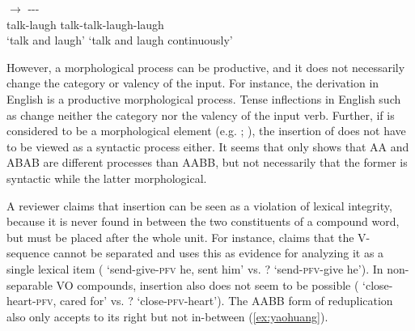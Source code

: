   \ex \gll {} $\rightarrow$ ---\\
  talk-laugh {} talk-talk-laugh-laugh\\ 
  \glt `talk and laugh' `talk and laugh continuously'
  \z
\z

However, a morphological process can be productive, and it does not necessarily change the category or valency of the input.
For instance, the  derivation in English is a productive morphological process.
Tense inflections in English such as  change neither the category nor the valency of the input verb.
Further, if  is considered to be a morphological element (e.g. \citealt[101--102]{Huangetal2009}; \citealt[246]{MuellerLipenkova2013}), the insertion of  does not have to be viewed as a syntactic
process either.
It seems that \citet{Xie2020} only shows that AA and ABAB are different processes than AABB, but not necessarily that the former is syntactic while the latter morphological.

A reviewer claims that  insertion can be seen as a violation of lexical integrity,
because it is never found in between the two constituents of a compound word,
but must be placed after the whole unit.
For instance, \citet[1282]{Her2006} claims that the V- sequence cannot be separated 
and uses this as evidence for analyzing it as a single lexical item 
(  `send-give-\textsc{pfv} he, sent him' vs. ?   `send-\textsc{pfv}-give he').
In non-separable VO compounds,  insertion also does not seem to be possible 
( `close-heart-\textsc{pfv}, cared for' vs. ?  `close-\textsc{pfv}-heart').
The AABB form of reduplication also only accepts  to its right but not in-between (\ref{ex:yaohuang}).
\ea\label{ex:yaohuang} %

